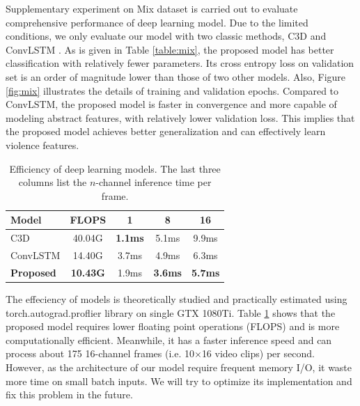 \documentclass[10pt,twocolumn,letterpaper]{article}
\begin{document}

Supplementary experiment on Mix dataset is carried out to evaluate comprehensive performance of deep learning model.
Due to the limited conditions, we only evaluate our model with two classic methods, C3D \cite{3dcnn_1} and ConvLSTM \cite{convlstm_sudh}. 
As is given in Table \ref{table:mix}, the proposed model has better classification with relatively fewer parameters.
Its cross entropy loss on validation set is an order of magnitude lower than those of two other models.
Also, Figure \ref{fig:mix} illustrates the details of training and validation epochs. 
Compared to ConvLSTM, the proposed model is faster in convergence and more capable of modeling abstract features, with relatively lower validation loss.
This implies that the proposed model achieves better generalization and can effectively learn violence features.


\begin{table}
\begin{center}
\caption{Efficiency of deep learning models. The last three columns list the $n$-channel inference time per frame.}
\label{table:efficiency}
\begin{tabular}{lcccc}
\hline
\textbf{Model} & \textbf{FLOPS} & \textbf{1} & \textbf{8} & \textbf{16}\\
\hline\hline
C3D \cite{3dcnn_1} & 40.04G & \textbf{1.1ms} & 5.1ms & 9.9ms \\
ConvLSTM \cite{convlstm_sudh} & 14.40G & 3.7ms & 4.9ms & 6.3ms \\
\textbf{Proposed} & \textbf{10.43G} & 1.9ms & \textbf{3.6ms} & \textbf{5.7ms} \\
\hline
\end{tabular}
\end{center}
\end{table}


The effeciency of models is theoretically studied and practically estimated using torch.autograd.proflier library on single GTX 1080Ti.
Table \ref{table:efficiency} shows that the proposed model requires lower floating point operations (FLOPS) and is more computationally efficient.
Meanwhile, it has a faster inference speed and can process about 175 16-channel frames (i.e. 10$\times$16 video clips) per second.
However, as the architecture of our model require frequent memory I/O, it waste more time on small batch inputs. 
We will try to optimize its implementation and fix this problem in the future.
 
\end{document}
